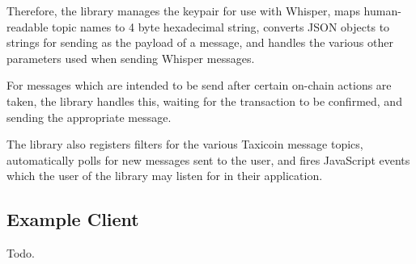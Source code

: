 Therefore, the library manages the keypair for use with Whisper, maps human-readable topic names to 4 byte hexadecimal string, converts JSON objects to strings for sending as the payload of a message, and handles the various other parameters used when sending Whisper messages.

For messages which are intended to be send after certain on-chain actions are taken, the library handles this, waiting for the transaction to be confirmed, and sending the appropriate message.

The library also registers filters for the various Taxicoin message topics, automatically polls for new messages sent to the user, and fires JavaScript events which the user of the library may listen for in their application.

\subsection{Example Client}

Todo.
